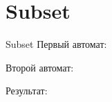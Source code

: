 \section{Subset}
\begin{frame}{Subset}
	Первый автомат:


	Второй автомат:


	Результат:

\end{frame}
